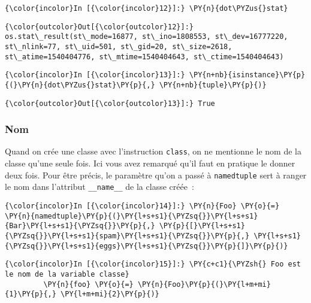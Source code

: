     \begin{Verbatim}[commandchars=\\\{\}]
{\color{incolor}In [{\color{incolor}12}]:} \PY{n}{dot\PYZus{}stat}
\end{Verbatim}


\begin{Verbatim}[commandchars=\\\{\}]
{\color{outcolor}Out[{\color{outcolor}12}]:} os.stat\_result(st\_mode=16877, st\_ino=1808553, st\_dev=16777220, st\_nlink=77, st\_uid=501, st\_gid=20, st\_size=2618, st\_atime=1540404776, st\_mtime=1540404643, st\_ctime=1540404643)
\end{Verbatim}
            
    \begin{Verbatim}[commandchars=\\\{\}]
{\color{incolor}In [{\color{incolor}13}]:} \PY{n+nb}{isinstance}\PY{p}{(}\PY{n}{dot\PYZus{}stat}\PY{p}{,} \PY{n+nb}{tuple}\PY{p}{)}
\end{Verbatim}


\begin{Verbatim}[commandchars=\\\{\}]
{\color{outcolor}Out[{\color{outcolor}13}]:} True
\end{Verbatim}
            
    \hypertarget{nom}{%
\subsubsection{Nom}\label{nom}}

    Quand on crée une classe avec l'instruction \texttt{class}, on ne
mentionne le nom de la classe qu'une seule fois. Ici vous avez remarqué
qu'il faut en pratique le donner deux fois. Pour être précis, le
paramètre qu'on a passé à \texttt{namedtuple} sert à ranger le nom dans
l'attribut \texttt{\_\_name\_\_} de la classe créée~:

    \begin{Verbatim}[commandchars=\\\{\}]
{\color{incolor}In [{\color{incolor}14}]:} \PY{n}{Foo} \PY{o}{=} \PY{n}{namedtuple}\PY{p}{(}\PY{l+s+s1}{\PYZsq{}}\PY{l+s+s1}{Bar}\PY{l+s+s1}{\PYZsq{}}\PY{p}{,} \PY{p}{[}\PY{l+s+s1}{\PYZsq{}}\PY{l+s+s1}{spam}\PY{l+s+s1}{\PYZsq{}}\PY{p}{,} \PY{l+s+s1}{\PYZsq{}}\PY{l+s+s1}{eggs}\PY{l+s+s1}{\PYZsq{}}\PY{p}{]}\PY{p}{)}
\end{Verbatim}


    \begin{Verbatim}[commandchars=\\\{\}]
{\color{incolor}In [{\color{incolor}15}]:} \PY{c+c1}{\PYZsh{} Foo est le nom de la variable classe}
         \PY{n}{foo} \PY{o}{=} \PY{n}{Foo}\PY{p}{(}\PY{l+m+mi}{1}\PY{p}{,} \PY{l+m+mi}{2}\PY{p}{)}
\end{Verbatim}


